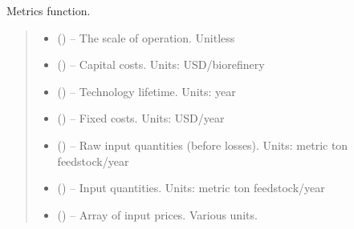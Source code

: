 \documentclass[letterpaper,10pt,english]{sphinxmanual}
\begin{document}
\begin{fulllineitems}
\label{\detokenize{technology:technology.tutorial_biorefinery.metrics}}
\pysigstartsignatures
{}
\pysigstopsignatures
\sphinxAtStartPar
Metrics function.
\begin{quote}\begin{description}
\begin{itemize}
\item {} 
\sphinxAtStartPar
{} () – The scale of operation. Unitless

\item {} 
\sphinxAtStartPar
{} () – Capital costs. Units: USD/biorefinery

\item {} 
\sphinxAtStartPar
{} () – Technology lifetime. Units: year

\item {} 
\sphinxAtStartPar
{} () – Fixed costs. Units: USD/year

\item {} 
\sphinxAtStartPar
{} () – Raw input quantities (before losses). Units: metric ton feedstock/year

\item {} 
\sphinxAtStartPar
{} () – Input quantities. Units: metric ton feedstock/year

\item {} 
\sphinxAtStartPar
{} () – Array of input prices. Various units.


\end{itemize}
\end{description}
\end{quote}
\end{fulllineitems}
\end{document}
